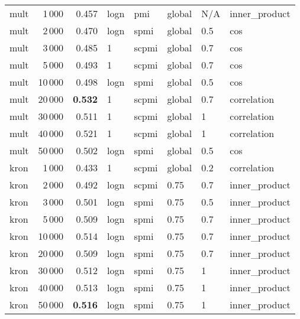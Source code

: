 \begin{tabular}{lrrlllll}
    mult &            1\,000 &  0.457 &  logn &    pmi &  global &  N/A &  inner\_product \\
    mult &            2\,000 &  0.470 &  logn &   spmi &  global &  0.5 &            cos \\
    mult &            3\,000 &  0.485 &     1 &  scpmi &  global &  0.7 &            cos \\
    mult &            5\,000 &  0.493 &     1 &  scpmi &  global &  0.7 &            cos \\
    mult &           10\,000 &  0.498 &  logn &   spmi &  global &  0.5 &            cos \\
    mult &           20\,000 &  \textbf{0.532} &     1 &  scpmi &  global &  0.7 &    correlation \\
    mult &           30\,000 &  0.511 &     1 &  scpmi &  global &    1 &    correlation \\
    mult &           40\,000 &  0.521 &     1 &  scpmi &  global &    1 &    correlation \\
    mult &           50\,000 &  0.502 &  logn &   spmi &  global &  0.5 &            cos \\ \addlinespace
    kron &            1\,000 &  0.433 &     1 &  scpmi &  global &  0.2 &    correlation \\
    kron &            2\,000 &  0.492 &  logn &  scpmi &    0.75 &  0.7 &  inner\_product \\
    kron &            3\,000 &  0.501 &  logn &   spmi &    0.75 &  0.5 &  inner\_product \\
    kron &            5\,000 &  0.509 &  logn &   spmi &    0.75 &  0.7 &  inner\_product \\
    kron &           10\,000 &  0.514 &  logn &   spmi &    0.75 &  0.7 &  inner\_product \\
    kron &           20\,000 &  0.509 &  logn &   spmi &    0.75 &  0.7 &  inner\_product \\
    kron &           30\,000 &  0.512 &  logn &   spmi &    0.75 &    1 &  inner\_product \\
    kron &           40\,000 &  0.513 &  logn &   spmi &    0.75 &    1 &  inner\_product \\
    kron &           50\,000 &  \textbf{0.516} &  logn &   spmi &    0.75 &    1 &  inner\_product \\
\bottomrule
\end{tabular}
